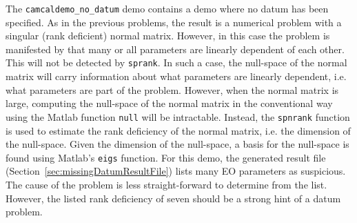 \documentclass{article}
\begin{document}
The \texttt{camcaldemo\_no\_datum} demo contains a demo where no datum
has been specified. As in the previous problems, the result is a
numerical problem with a singular (rank deficient) normal matrix.
However, in this case the problem is manifested by that many or all
parameters are linearly dependent of each other. This will not be
detected by \texttt{sprank}. In such a case, the null-space of the
normal matrix will carry information about what parameters are
linearly dependent, i.e. what parameters are part of the problem.
However, when the normal matrix is large, computing the null-space of
the normal matrix in the conventional way using the Matlab function
\texttt{null} will be intractable. Instead, the \texttt{spnrank}
\citep{Foster2009:Calculating} function is used to estimate the rank
deficiency of the normal matrix, i.e. the dimension of the null-space.
Given the dimension of the null-space, a basis for the null-space is
found using Matlab's \texttt{eigs} function. For this demo, the
generated result file (Section~\ref{sec:missingDatumResultFile}) lists
many EO parameters as suspicious. The cause of the problem is less
straight-forward to determine from the list. However, the listed rank
deficiency of seven should be a strong hint of a datum problem.
\end{document}
